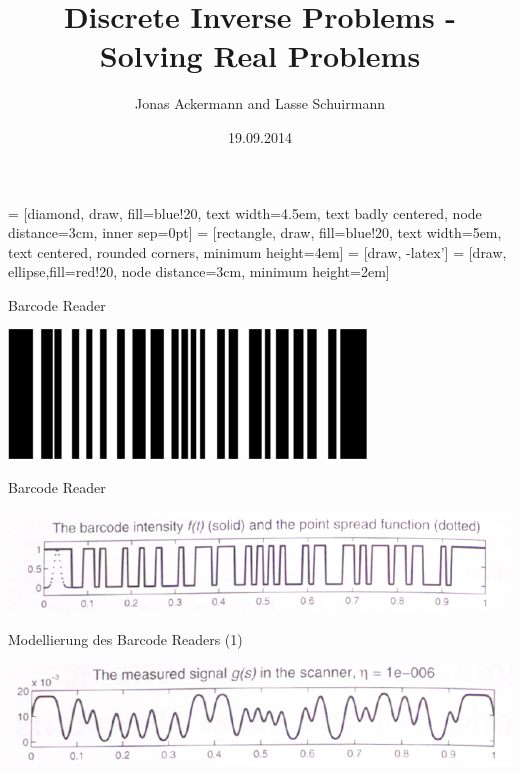 \documentclass[11pt]{beamer}
\author{Jonas Ackermann and Lasse Schuirmann}
\title{Discrete Inverse Problems - Solving Real Problems}
\date{19.09.2014}
\begin{document}
 = [diamond, draw, fill=blue!20, 
    text width=4.5em, text badly centered, node distance=3cm, inner sep=0pt]
 = [rectangle, draw, fill=blue!20, 
    text width=5em, text centered, rounded corners, minimum height=4em]
 = [draw, -latex']
 = [draw, ellipse,fill=red!20, node distance=3cm,
    minimum height=2em]

\begin{frame}
\titlepage
\end{frame}


\begin{frame}
\tableofcontents
\end{frame}


\begin{frame}{Barcode Reader}
\begin{center}
\includegraphics[scale=0.5]{Barcode_example.PNG} 
\end{center}
\end{frame}


\begin{frame}{Barcode Reader}
\begin{center}
\includegraphics[scale=0.5]{Barcode_f.PNG} 
\end{center}
\end{frame}


\begin{frame}{Modellierung des Barcode Readers (1)}
\begin{center}
\includegraphics[scale=0.5]{Barcode_g.PNG} 
\end{center}
\end{frame}
\end{document}
